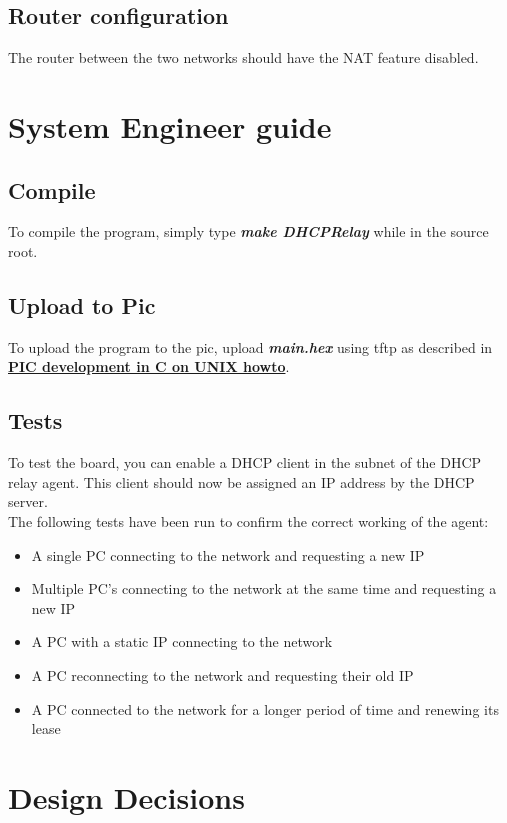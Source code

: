 \documentclass[11pt,a4paper]{scrartcl}
\begin{document}
\subsection{Router configuration}
The router between the two networks should have the NAT feature disabled.

\section{System Engineer guide}
\subsection{Compile}
To compile the program, simply type \textbf{\textit{make DHCPRelay}} while in the source root.

\subsection{Upload to Pic}
To upload the program to the pic, upload \textbf{\textit{main.hex}} using tftp as described in \href{http://www.foditic.org/SORTES\_14/missions/picUnixE.php}{\textbf{PIC development in C on UNIX howto}}.

\subsection{Tests}
To test the board, you can enable a DHCP client in the subnet of the DHCP relay agent. This client should now be assigned an IP address by the DHCP server.\\

The following tests have been run to confirm the correct working of the agent:
\begin{itemize}
\item A single PC connecting to the network and requesting a new IP
\item Multiple PC's connecting to the network at the same time and requesting a new IP
\item A PC with a static IP connecting to the network
\item A PC reconnecting to the network and requesting their old IP
\item A PC connected to the network for a longer period of time and renewing its lease
\end{itemize}

\section{Design Decisions}
\end{document}
